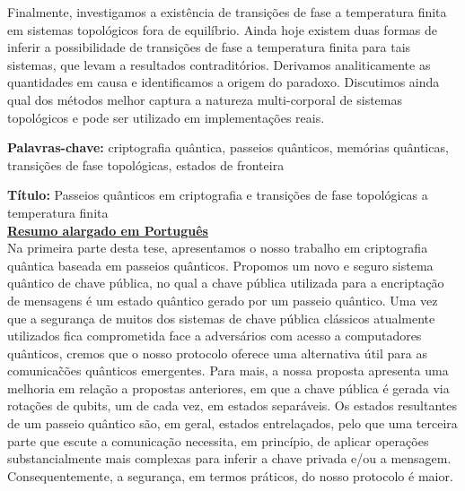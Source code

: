 \documentclass[12pt]{report}
\begin{document}
Finalmente, investigamos a exist\^{e}ncia de transi\c{c}\~{o}es de fase a temperatura finita em sistemas topol\'{o}gicos fora de equil\'{i}brio. Ainda hoje existem duas formas de inferir a possibilidade de transi\c{c}\~{o}es de fase a temperatura finita para tais sistemas, que levam a resultados contradit\'{o}rios. Derivamos analiticamente as quantidades em causa e identificamos a origem do paradoxo. Discutimos ainda qual dos m\'{e}todos melhor captura a natureza multi-corporal de sistemas topol\'{o}gicos e pode ser utilizado em implementa\c{c}\~{o}es reais.

\vfill
\begin{flushleft}
\textbf{Palavras-chave:} criptografia qu\^{a}ntica, passeios qu\^{a}nticos, mem\'{o}rias qu\^{a}nticas, transi\c{c}\~{o}es de fase topol\'{o}gicas, estados de fronteira
\end{flushleft}
\newpage
\noindent\textbf{T\'itulo:} Passeios qu\^{a}nticos em criptografia e transi\c{c}\~{o}es de fase topol\'{o}gicas a temperatura finita\\

\noindent\underline{\textbf{Resumo alargado em Portugu\^{e}s}}\\
Na primeira parte desta tese, apresentamos o nosso trabalho em criptografia qu\^{a}ntica baseada em passeios  qu\^{a}nticos. Propomos um novo e seguro sistema qu\^{a}ntico de chave p\'{u}blica, no qual a chave p\'{u}blica utilizada para a encripta\c{c}\~{a}o de mensagens \'{e} um estado qu\^{a}ntico gerado por um passeio qu\^{a}ntico. Uma vez que a seguran\c{c}a de muitos dos sistemas de chave p\'{u}blica cl\'{a}ssicos atualmente utilizados fica comprometida face a advers\'{a}rios com acesso a computadores qu\^{a}nticos, cremos que o nosso protocolo oferece uma alternativa \'{u}til para as comunica\~{c}\~{o}es qu\^{a}nticos emergentes. Para mais, a nossa proposta apresenta uma melhoria em rela\c{c}\~{a}o a propostas anteriores, em que a chave p\'{u}blica \'{e} gerada via rota\c{c}\~{o}es de qubits, um de cada vez, em estados separ\'{a}veis. Os estados resultantes de um passeio qu\^{a}ntico s\~{a}o, em geral, estados entrela\c{c}ados, pelo que uma terceira parte que escute a comunica\c{c}\~{a}o necessita, em princ\'{i}pio, de aplicar opera\c{c}\~{o}es substancialmente mais complexas para inferir a chave privada e/ou a mensagem. Consequentemente, a seguran\c{c}a, em termos pr\'{a}ticos, do nosso protocolo \'{e} maior.
\end{document}
